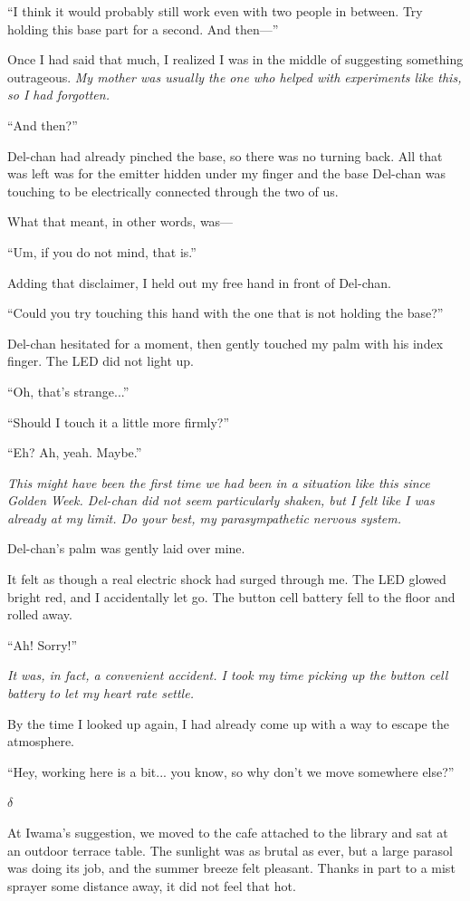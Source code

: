 \documentclass[
    a4paper,
    12pt,
    twoside,
    openany,
    UTF8,
    fontset=windows
]{ctexbook}
\begin{document}
``I think it would probably still work even with two people in between. Try holding this base part for a second. And then---''

Once I had said that much, I realized I was in the middle of suggesting something outrageous. \textit{My mother was usually the one who helped with experiments like this, so I had forgotten.}

``And then?''

Del-chan had already pinched the base, so there was no turning back. All that was left was for the emitter hidden under my finger and the base Del-chan was touching to be electrically connected through the two of us.

What that meant, in other words, was---

``Um, if you do not mind, that is.''

Adding that disclaimer, I held out my free hand in front of Del-chan.

``Could you try touching this hand with the one that is not holding the base?''

Del-chan hesitated for a moment, then gently touched my palm with his index finger. The LED did not light up.

``Oh, that's strange...''

``Should I touch it a little more firmly?''

``Eh? Ah, yeah. Maybe.''

\textit{This might have been the first time we had been in a situation like this since Golden Week. Del-chan did not seem particularly shaken, but I felt like I was already at my limit. Do your best, my parasympathetic nervous system.}

Del-chan's palm was gently laid over mine.

It felt as though a real electric shock had surged through me. The LED glowed bright red, and I accidentally let go. The button cell battery fell to the floor and rolled away.

``Ah! Sorry!''

\textit{It was, in fact, a convenient accident. I took my time picking up the button cell battery to let my heart rate settle.}

By the time I looked up again, I had already come up with a way to escape the atmosphere.

``Hey, working here is a bit... you know, so why don't we move somewhere else?''

$\delta$

At Iwama's suggestion, we moved to the cafe attached to the library and sat at an outdoor terrace table. The sunlight was as brutal as ever, but a large parasol was doing its job, and the summer breeze felt pleasant. Thanks in part to a mist sprayer some distance away, it did not feel that hot.
\end{document}
